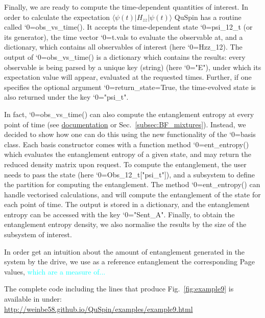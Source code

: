\documentclass{SciPost}
\newcommand\0{\scalebox{-1}[1]{0}}
\let\svttfamily\ttfamily
\renewcommand\ttfamily{\svttfamily\catcode`0=\active }
\renewcommand\texttt{\bgroup\ttfamily\texttthelp}
\def\texttthelp#1{#1\egroup}
\newcommand*{\cyan}{\textcolor{cyan}}
\newcommand{\Spincode}{example9.py}
\begin{document}

Finally, we are ready to compute the time-dependent quantities of interest. In order to calculate the expectation $\langle\psi(t)|H_{zz}|\psi(t)\rangle$ QuSpin has a routine called \texttt{obs\_vs\_time()}. It accepts the time-dependent state \texttt{psi\_12\_t} (or its generator), the time vector \texttt{t.vals} to evaluate the observable at, and a dictionary, which contains all observables of interest (here \texttt{Hzz\_12}). The output of \texttt{obs\_vs\_time()} is a dictionary which contains the results: every observable is being parsed by a unique key (string) (here \texttt{"E"}), under which its expectation value will appear, evaluated at the requested times. Further, if one specifies the optional argument \texttt{return\_state=True}, the time-evolved state is also returned under the key \texttt{"psi\_t"}. 

In fact, \texttt{obs\_vs\_time()} can also compute the entanglement entropy at every point of time (see \href{http://weinbe58.github.io/QuSpin/index.html}{documentation} or Sec.~\ref{subsec:BF_mixtures}). Instead, we decided to show how one can do this using the new functionality of the \texttt{basis} class. Each basis constructor comes with a function method \texttt{ent\_entropy()} which evaluates the entanglement entropy of a given state, and may return the reduced density matrix upon request. To compute the entanglement, the user needs to pass the state (here \texttt{Obs\_12\_t["psi\_t"]}), and a subsystem to define the partition for computing the entanglement. The method \texttt{ent\_entropy()} can handle vectorised calculations, and will compute the entanglement of the state for each point of time. The output is stored in a dictionary, and the entanglement entropy can be accessed with the key \texttt{"Sent\_A"}. Finally, to obtain the entanglement entropy density, we also normalise the results by the size of the subsystem of interest.

In order get an intuition about the amount of entanglement generated in the system by the drive, we use as a reference entanglement the corresponding Page values, \cyan{which are a measure of...}


The complete code including the lines that produce Fig.~\ref{fig:example9} is available in under:\\

\href{http://weinbe58.github.io/QuSpin/examples/example9.html}{http://weinbe58.github.io/QuSpin/examples/example9.html}\\
\end{document}

